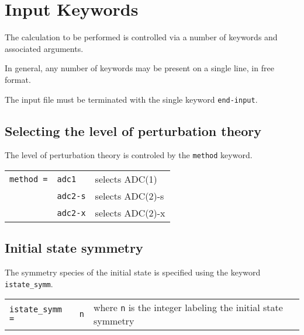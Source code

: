 \documentclass[12pt]{article}
\newcommand*\code[1]{\mbox{\texttt{{#1}}}} %
\begin{document}
\section*{Input Keywords}

\noindent
The calculation to be performed is controlled via a number of keywords
and associated arguments.

\vspace{0.2cm}
\noindent
In general, any number of keywords may be present on a single line, in
free format.

\vspace{0.2cm}
\noindent
The input file must be terminated with the single keyword
\code{end-input}.

\subsection*{Selecting the level of perturbation theory}
\noindent
The level of perturbation theory is controled by the \code{method} keyword.

\begin{table}[h]
\vspace*{1.7ex}
\begin{center}
\begin{tabular}{llp{2.5in}}
\code{method =} & \code{adc1}   & selects ADC(1) \\
                & \code{adc2-s} & selects ADC(2)-s \\
                & \code{adc2-x} & selects ADC(2)-x \\
\end{tabular}
\end{center}
\end{table}

\subsection*{Initial state symmetry}
\noindent
The symmetry species of the initial state is specified using the
keyword \code{istate\_symm}.

\begin{table}[h]
\vspace*{1.7ex}
\begin{center}
\begin{tabular}{llp{2.5in}}
\code{istate\_symm =} & \code{n}   & where \code{n} is the integer labeling the initial state symmetry \\
\end{tabular}
\end{center}
\end{table}
\end{document}
